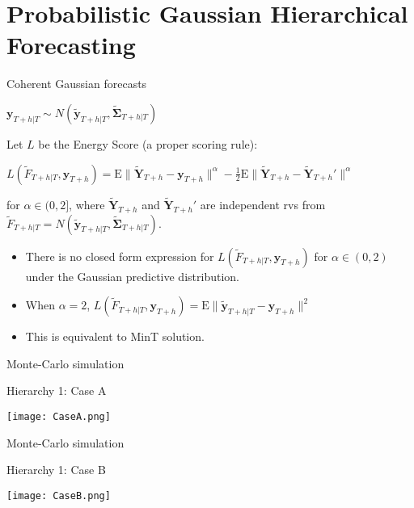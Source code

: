 \documentclass[14pt]{beamer}
\def\E{\text{E}}
\def\E{\text{E}}
\begin{document}
\section{Probabilistic Gaussian Hierarchical Forecasting}

\begin{frame}{Coherent Gaussian forecasts}\fontsize{14}{16}\sf
\begin{alertblock}{}
\centerline{$\bm{y}_{T+h|T} \sim N(\tilde{\bm{y}}_{T+h|T}, \tilde{\bm{\Sigma}}_{T+h|T})$}
\end{alertblock}

Let $L$ be the Energy Score (a proper scoring rule):
\begin{block}{}\fontsize{14}{14}\sf
\centerline{$L(\tilde{F}_{T+h|T}, \bm{y}_{T+h}) = \text{E}\| \tilde{\bm{Y}}_{T+h} - \bm{y}_{T+h} \|^\alpha\textstyle
- \frac{1}{2}\text{E}\| \tilde{\bm{Y}}_{T+h} - \tilde{\bm{Y}}_{T+h}' \|^\alpha$}
for $\alpha \in (0,2]$, where $\tilde{\bm{Y}}_{T+h}$ and $\tilde{\bm{Y}}_{T+h}'$ are independent rvs from $\tilde{F}_{T+h|T} = N(\tilde{\bm{y}}_{T+h|T}, \tilde{\bm{\Sigma}}_{T+h|T})$.
\end{block}

\begin{itemize}
  \item There is no closed form expression for $L(\tilde{F}_{T+h|T}, \bm{y}_{T+h})$ for $\alpha \in (0,2)$ under the Gaussian predictive distribution.
\item When $\alpha=2$,  $L(\tilde{F}_{T+h|T}, \bm{y}_{T+h}) = \E\| \tilde{\bm{y}}_{T+h|T} - \bm{y}_{T+h} \|^2$
\item This is equivalent to MinT solution.
\end{itemize}
\end{frame}

\begin{frame}{Monte-Carlo simulation}

\begin{block}{Hierarchy 1: Case A}
\centerline{\texttt{[image: CaseA.png]}}
\end{block}

\end{frame}

\begin{frame}{Monte-Carlo simulation}

\begin{block}{Hierarchy 1: Case B}
\centerline{\texttt{[image: CaseB.png]}}
\end{block}

\end{frame}
\end{document}
